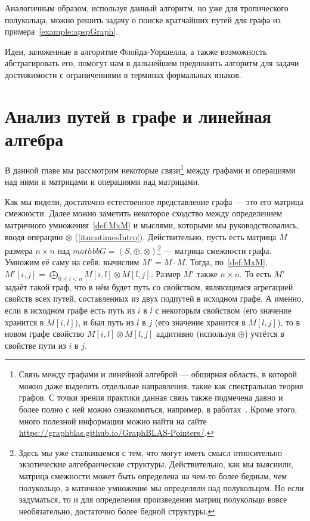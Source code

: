 Аналогичным образом, используя данный алгоритм, но уже для тропического полукольца, можно решить задачу о поиске кратчайших путей для графа из примера~\ref{example:apspGraph}.

Идеи, заложенные в алгоритме Флойда-Уоршелла, а также возможность абстрагировать его, помогут нам в дальнейшем предложить алгоритм для задачи достижимости с ограничениями в терминах формальных языков.

\section{Анализ путей в графе и линейная алгебра}

В данной главе мы рассмотрим некоторые связи\footnote{Связь между графами и линейной алгеброй --- обширная область, в которой можно даже выделить отдельные направления, такие как спектральная теория графов. С точки зрения практики данная связь также подмечена давно и более полно с ней можно ознакомиться, например, в работах~\cite{doi:10.1137/1.9780898719918, Davis2018Algorithm9S}. Кроме этого, много полезной информации можно найти на сайте \url{https://graphblas.github.io/GraphBLAS-Pointers/}.} между графами и операциями над ними и матрицами и операциями над матрицами.

Как мы видели, достаточно естественное представление графа --- это его матрица смежности. Далее можно заметить некоторое сходство между определением матричного умножения~\ref{def:MxM} и мыслями, которыми мы руководствовались, вводя операцию $\otimes$ (\ref{itm:otimesIntro}). Действительно, пусть есть матрица $M$ размера $n \times n$ над $mathbb{G} = (S,\oplus,\otimes)$\footnote{Здесь мы уже сталкиваемся с тем, что могут иметь смысл относительно экзотические алгебраические структуры. Действительно, как мы выяснили, матрица смежности может быть определена на чем-то более бедным, чем полукольцо, а матичное умножение мы определяли над полукольцом. Но если задуматься, то и для определения произведения матриц полукольцо вовсе необязательно, достаточно более бедной структуры.} --- матрица смежности графа. Умножим её саму на себя: вычислим $M'= M \cdot M$. Тогда, по~\ref{def:MxM}, $M'[i,j] = \bigoplus_{0 \leq l < n} M[i,l] \otimes M[l,j]$. Размер $M'$ также $n \times n$. То есть $M'$ задаёт такой граф, что в нём будет путь со свойством, являющимся агрегацией свойств всех путей, составленных из двух подпутей в исходном графе. А именно, если в исходном графе есть путь из $i$ в $l$ с некоторым свойством (его значение хранится в $M[i,l]$), и был путь из $l$ в $j$ (его значение хранится в $M[l,j]$), то в новом графе свойство $M[i,l] \otimes M[l,j]$ аддитивно (используя $\oplus$) учтётся в свойстве пути из $i$ в $j$.

